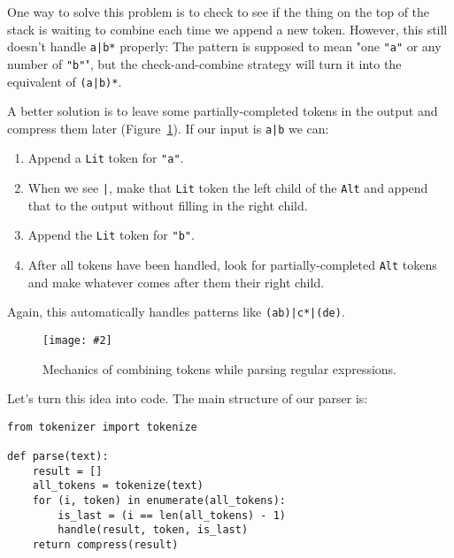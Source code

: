 \documentclass{scrbook}
\newcommand{\figref}[1]{Figure~\ref{#1}}
\newcommand{\figpdf}[4]{\begin{figure}%
\centering%
\texttt{[image: \#2]}%
\caption{#3}%
\label{#1}%
\end{figure}}
\begin{document}
One way to solve this problem is to check to see if the thing on the top of the stack is waiting to combine
each time we append a new token.
However,
this still doesn't handle \texttt{a|b*} properly:
The pattern is supposed to mean "one \texttt{"a"} or any number of \texttt{"b"}",
but the check-and-combine strategy will turn it into the equivalent of \texttt{(a|b)*}.


A better solution is to leave some partially-completed tokens in the output
and compress them later (\figref{parser-mechanics}).
If our input is \texttt{a|b} we can:

\begin{enumerate}

\item 

Append a \texttt{Lit} token for \texttt{"a"}.



\item 

When we see \texttt{|},
    make that \texttt{Lit} token the left child of the \texttt{Alt}
    and append that to the output without filling in the right child.



\item 

Append the \texttt{Lit} token for \texttt{"b"}.



\item 

After all tokens have been handled,
    look for partially-completed \texttt{Alt} tokens and make whatever comes after them their right child.



\end{enumerate}


Again, this automatically handles patterns like \texttt{(ab)|c*|(de)}.

\figpdf{parser-mechanics}{./parser/mechanics.pdf}{Mechanics of combining tokens while parsing regular expressions.}{0.6}


Let's turn this idea into code.
The main structure of our parser is:


\begin{lstlisting}[frame=single,frameround=tttt]
from tokenizer import tokenize

def parse(text):
    result = []
    all_tokens = tokenize(text)
    for (i, token) in enumerate(all_tokens):
        is_last = (i == len(all_tokens) - 1)
        handle(result, token, is_last)
    return compress(result)
\end{lstlisting}
\end{document}
